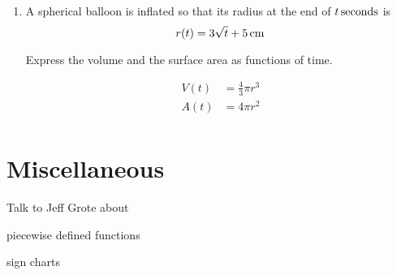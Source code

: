 \documentclass{exam}
\begin{document}
\begin{enumerate}
\begin{solution}
    \end{solution}
    
  \item A spherical balloon is inflated so that its radius at the end of $\unit[t]{seconds}$ is 
    \[
      r(t) = \unit[3 \sqrt{t} + 5]{cm}
    \]

    Express the volume and the surface area as functions of time.

    \begin{solution}
      \begin{align*}
        V(t) &= \frac{4}{3} \pi r^3 \\
        A(t) &= 4 \pi r^2 \\
      \end{align*}
    \end{solution}

\end{enumerate}


\section{Miscellaneous}

Talk to Jeff Grote about 
\begin{itemize*}
  \item piecewise defined functions
  \item sign charts
\end{itemize*}
\end{document}
